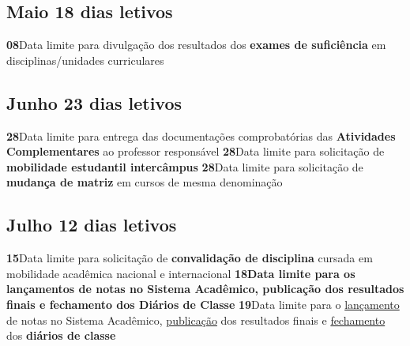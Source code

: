 \documentclass[thesis]{hmcposter}
\begin{document}
\begin{poster}
\subsection{Maio \hfill 18 dias letivos}\textbf{08}\qquad Data limite para divulgação dos resultados dos \textbf{exames de suficiência} em disciplinas/unidades curriculares \newline \null\subsection{Junho \hfill 23 dias letivos}\textbf{28}\qquad Data limite para entrega das documentações comprobatórias das \textbf{Atividades Complementares} ao professor responsável \newline \null\textbf{28}\qquad Data limite para solicitação de \textbf{mobilidade estudantil intercâmpus} \newline \null\textbf{28}\qquad Data limite para solicitação de \textbf{mudança de matriz} em cursos de mesma denominação \newline \null\subsection{Julho \hfill 12 dias letivos}\textbf{15}\qquad Data limite para solicitação de \textbf{convalidação de disciplina} cursada em mobilidade acadêmica nacional e internacional \newline \null\textbf{18}\qquad \textbf{Data limite para os lançamentos de notas no Sistema Acadêmico, publicação dos resultados finais e fechamento dos Diários de Classe} \newline \null\textbf{19}\qquad Data limite para o \underline{lançamento} de notas no Sistema Acadêmico, \underline{publicação} dos resultados finais e \underline{fechamento} dos \textbf{diários de classe} \newline \null\newpage

\end{poster}
\end{document}
